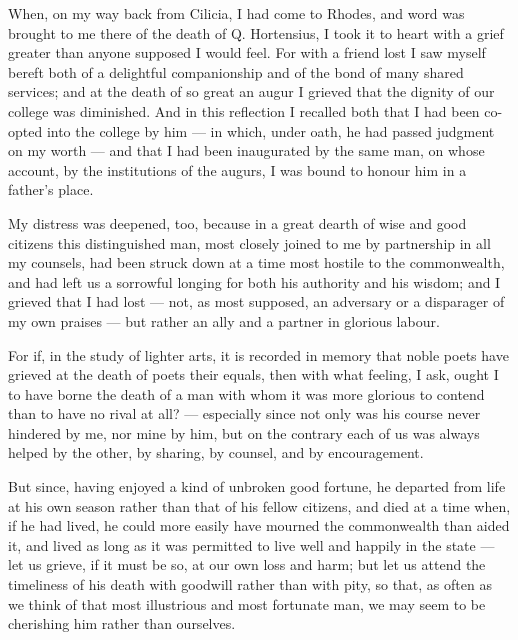 
 When, on my way back from Cilicia, I had come to Rhodes, and word was brought to me there of the death of Q. Hortensius, I took it to heart with a grief greater than anyone supposed I would feel. For with a friend lost I saw myself bereft both of a delightful companionship and of the bond of many shared services; and at the death of so great an augur I grieved that the dignity of our college was diminished. And in this reflection I recalled both that I had been co-opted into the college by him — in which, under oath, he had passed judgment on my worth — and that I had been inaugurated by the same man, on whose account, by the institutions of the augurs, I was bound to honour him in a father's place.

 My distress was deepened, too, because in a great dearth of wise and good citizens this distinguished man, most closely joined to me by partnership in all my counsels, had been struck down at a time most hostile to the commonwealth, and had left us a sorrowful longing for both his authority and his wisdom; and I grieved that I had lost — not, as most supposed, an adversary or a disparager of my own praises — but rather an ally and a partner in glorious labour.

 For if, in the study of lighter arts, it is recorded in memory that noble poets have grieved at the death of poets their equals, then with what feeling, I ask, ought I to have borne the death of a man with whom it was more glorious to contend than to have no rival at all? — especially since not only was his course never hindered by me, nor mine by him, but on the contrary each of us was always helped by the other, by sharing, by counsel, and by encouragement.

 But since, having enjoyed a kind of unbroken good fortune, he departed from life at his own season rather than that of his fellow citizens, and died at a time when, if he had lived, he could more easily have mourned the commonwealth than aided it, and lived as long as it was permitted to live well and happily in the state — let us grieve, if it must be so, at our own loss and harm; but let us attend the timeliness of his death with goodwill rather than with pity, so that, as often as we think of that most illustrious and most fortunate man, we may seem to be cherishing him rather than ourselves.

